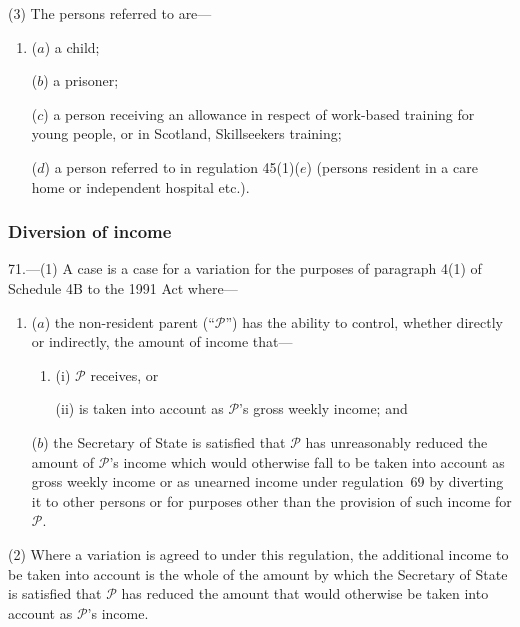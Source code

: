 \documentclass[12pt,a4paper]{article}
\begin{document}
(3) The persons referred to are—
\begin{enumerate}\item[]
($a$) a child;

($b$) a prisoner;

($c$) a person receiving an allowance in respect of work-based training for young people, or in Scotland, Skillseekers training;

($d$) a person referred to in regulation 45(1)($e$)  (persons resident in a care home or independent hospital etc.).
\end{enumerate}


\subsubsection[71. Diversion of income]{Diversion of income}

71.---(1)  A case is a case for a variation for the purposes of paragraph 4(1) of Schedule 4B to the 1991 Act where—
\begin{enumerate}\item[]
($a$) the non-resident parent (“$\mathcal{P}$”) has the ability to control, whether directly or indirectly, the amount of income that—
\begin{enumerate}\item[]
(i) $\mathcal{P}$ receives, or

(ii) is taken into account as $\mathcal{P}$’s gross weekly income; and
\end{enumerate}

($b$) the Secretary of State is satisfied that $\mathcal{P}$ has unreasonably reduced the amount of $\mathcal{P}$’s income which would otherwise fall to be taken into account as gross weekly income or as unearned income under regulation~69 by diverting it to other persons or for purposes other than the provision of such income for $\mathcal{P}$.
\end{enumerate}

(2) Where a variation is agreed to under this regulation, the additional income to be taken into account is the whole of the amount by which the Secretary of State is satisfied that $\mathcal{P}$ has reduced the amount that would otherwise be taken into account as $\mathcal{P}$’s income.
\end{document}
